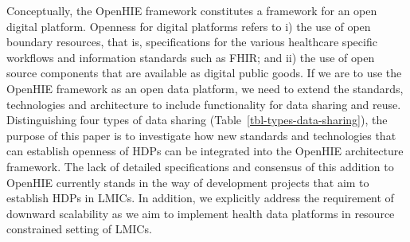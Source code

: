 \documentclass[
  authoryear]{elsarticle}
\begin{document}
Conceptually, the OpenHIE framework constitutes a framework for an open
digital platform. Openness for digital platforms refers to i) the use of
open boundary resources, that is, specifications for the various
healthcare specific workflows and information standards such as FHIR;
and ii) the use of open source components that are available as digital
public goods\citep{digitalpublicgoods}. If we are to use the OpenHIE
framework as an open data platform, we need to extend the standards,
technologies and architecture to include functionality for data sharing
and reuse. Distinguishing four types of data sharing
(Table~\ref{tbl-types-data-sharing}), the purpose of this paper is to
investigate how new standards and technologies that can establish
openness of HDPs can be integrated into the OpenHIE architecture
framework. The lack of detailed specifications and consensus of this
addition to OpenHIE currently stands in the way of development projects
that aim to establish HDPs in LMICs. In addition, we explicitly address
the requirement of downward scalability as we aim to implement health
data platforms in resource constrained setting of LMICs.
\end{document}
